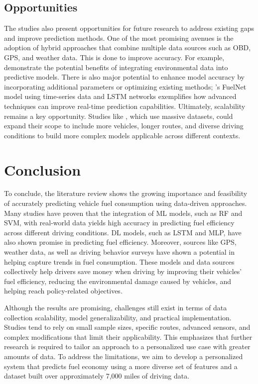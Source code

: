 \documentclass[letterpaper]{article}
\begin{document}
\subsection*{Opportunities}

The studies also present opportunities for future research to address existing gaps and improve 
prediction methods. One of the most promising avenues is the adoption of hybrid approaches that 
combine multiple data sources such as OBD, GPS, and weather data. This is done to improve 
accuracy. For example, \cite{filla2025using} demonstrate the potential benefits of integrating 
environmental data into predictive models. There is also major potential to enhance model 
accuracy by incorporating additional parameters or optimizing existing methods; 
\cite{wang2020fuelnet}'s  FuelNet model using time-series data and LSTM networks exemplifies 
how advanced techniques can improve real-time prediction capabilities. Ultimately, scalability 
remains a key opportunity. Studies like \cite{yang2022predicting}, which use massive datasets, 
could expand their scope to include more vehicles, longer routes, and diverse driving conditions 
to build more complex models applicable across different contexts.


\section*{Conclusion}

To conclude, the literature review shows the growing importance and feasibility
of accurately predicting vehicle fuel consumption using data-driven approaches.
Many studies have proven that the integration of ML models, such as RF and SVM,
with real-world data yields high accuracy in predicting fuel efficiency across
different driving conditions. DL models, such as LSTM and MLP, have also shown
promise in predicting fuel efficiency. Moreover, sources like GPS, weather data,
as well as driving behavior surveys have shown a potential in helping capture
trends in fuel consumption. These models and data sources collectively help
drivers save money when driving by improving their vehicles' fuel efficiency,
reducing the environmental damage caused by vehicles, and helping reach
policy-related objectives. 

Although the results are promising, challenges still exist in terms of data collection 
scalability, model generalizability, and practical implementation. Studies tend to rely on 
small sample sizes, specific routes, advanced sensors, and complex modifications that limit 
their applicability. This emphasizes that further research is required to tailor an approach 
to a personalized use case with greater amounts of data. To address the limitations, we aim 
to develop a personalized system that predicts fuel economy using a more diverse set of 
features and a dataset built over approximately 7,000 miles of driving data.

 

\end{document}
